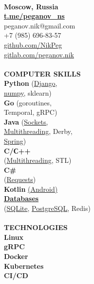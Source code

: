 \documentclass{article}
\begin{document}
\begin{vwcol}[widths={0.8,0.2},
 sep=.8cm, justify=flush,rule=0pt,indent=1em]
\newpage
~\\
\noindent\textbf{Moscow, Russia}\\
\noindent\textbf{\textcolor[rgb]{0.1255,0.2902,0.7843}{\href{https://t.me/peganov\_ns}{t.me/peganov\_ns}}}\\
peganov.nik@gmail.com\\
+7 (985) 696-83-57\\
\href{https://github.com/NikPeg}{github.com/NikPeg}\\
\href{https://gitlab.com/peganov.nik}{gitlab.com/peganov.nik}\\
\\
\noindent\textcolor[rgb]{0.1255,0.2902,0.7843}{\textbf{COMPUTER SKILLS}}\\
\textbf{Python} (\href{https://github.com/igoose1/wikirace}{Django},\\
\href{https://github.com/NikPeg/Reinforcement-learning-for-resource-allocation-tasks-in-the-cloud}{numpy}, sklearn)\\
\textbf{Go} (goroutines,\\
Temporal, gRPC)\\
\textbf{Java} (\href{https://github.com/NikPeg/jigsaw_sockets_and_saving}{Sockets,}\\
\href{https://github.com/NikPeg/StudentsBooks}{Multithreading}, Derby,\\
 \href{https://github.com/NikPeg/TukachBot}{Spring})\\
\textbf{C/С++}\\
(\href{https://github.com/NikPeg/OS_multithreaded_tasks}{Multithreading}, STL)\\
\textbf{C\#}\\
(\href{https://gitlab.com/peganov.nik/messengerapi}{Requests})\\
\textbf{Kotlin} \href{https://gitlab.com/peganov.nik/smartlearning}{(Android)}\\
\textbf{\href{https://github.com/NikPeg/CoffeePult}{Databases}}\\
(\href{https://github.com/NikPeg/ExtraterrestrialBot}{SQLite}, \href{https://github.com/NikPeg/CoffeePult}{PostgreSQL}, Redis)\\
\\
\noindent\textcolor[rgb]{0.1255,0.2902,0.7843}{\textbf{TECHNOLOGIES}}\\
\textbf{
Linux\\
gRPC\\
Docker\\
Kubernetes\\
CI/CD\\
}
\end{vwcol}
\end{document}
